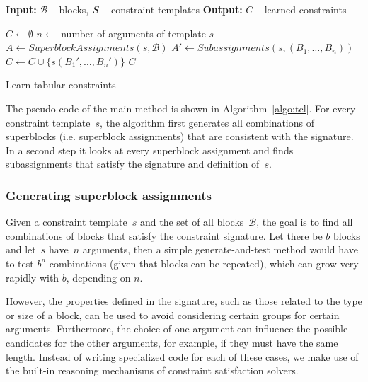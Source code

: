\documentclass{IEEEtran}
\newcommand{\format}[1]{\textit{#1}\xspace}
\newcommand{\generategroups}{\format{SuperblockAssignments}}
\newcommand{\findassignment}{\format{Subassignments}}
\newcommand{\CSignature}{Signature\xspace}
\newcommand{\CFunction}{Definition\xspace}
\newcommand{\blocks}{\ensuremath{\mathcal{B}}\xspace}
\theoremstyle{definition}
\begin{document}
\begin{algorithm}[t]
  \begin{algorithmic}[1]
    \footnotesize
    \State \textbf{Input:} $\blocks$ -- blocks, $\temps$ -- constraint templates
    \State \textbf{Output:} $C$ -- learned constraints

    \Procedure{LearnConstraints}{$\blocks$, $\temps$}
      \State $C \gets \emptyset$ %
        \State $n \gets$ number of arguments of template $s$
        \State $A \gets \generategroups(s, \blocks)$
        \State $A' \gets \findassignment(s, (B_1,\dots,B_n))$
            \State $C \gets C \cup \{ s(B_1', \dots, B_n') \}$
          \EndFor
        \EndFor
      \EndFor
      \State \Return $C$
    \EndProcedure
\end{algorithmic}
\caption{Learn tabular constraints}
\label{algo:tcl}
\end{algorithm}

The pseudo-code of the main method is shown in Algorithm~\ref{algo:tcl}.
For every constraint template~$s$, the algorithm first generates all combinations of superblocks (i.e. superblock assignments) that are consistent with the signature.
In a second step it looks at every superblock assignment and finds subassignments that satisfy the signature and definition of~$s$.





\subsubsection{Generating superblock assignments}
Given a constraint template~$s$ and the set of all blocks~\blocks, the goal is to find all combinations of blocks that satisfy the constraint signature. Let there be $b$ blocks and let~$s$ have~$n$ arguments, then a simple generate-and-test method would have to test $b^n$ combinations (given that blocks can be repeated), which can grow very rapidly with $b$, depending on $n$.

However, the properties defined in the signature, such as those related to the type or size of a block, can be used to avoid considering certain groups for certain arguments.
Furthermore, the choice of one argument can influence the possible candidates for the other arguments, for example, if they must have the same length.
Instead of writing specialized code for each of these cases, we make use of the built-in reasoning mechanisms of constraint satisfaction solvers.
\end{document}
